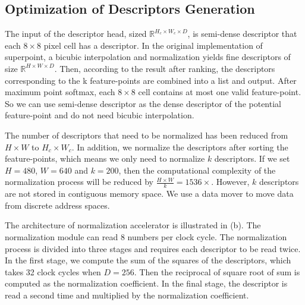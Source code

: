 



\subsection{Optimization of Descriptors Generation}

The input of the descriptor head, sized $\mathbb{R}^{H_c\times W_c\times D}$, is semi-dense descriptor that each $8\times8$ pixel cell has a descriptor. In the original implementation of superpoint, a bicubic interpolation and normalization yields fine descriptors of size $\mathbb{R}^{H\times W\times D}$. Then, according to the result after ranking, the descriptors corresponding to the k feature-points are combined into a list and output. After maximum point softmax, each $8\times8$ cell contains at most one valid feature-point. So we can use semi-dense descriptor as the dense descriptor of the potential feature-point and do not need bicubic interpolation.




The number of descriptors that need to be normalized has been reduced from $H\times W$ to $H_c\times W_c$. In addition, we normalize the descriptors after sorting the feature-points, which means we only need to normalize $k$ descriptors. If we set $H=480$, $W=640$ and $k=200$, then the computational complexity of the normalization process will be reduced by $\frac{H \times W}{k}=1536\times$. However, $k$ descriptors are not stored in contiguous memory space. We use a data mover to move data from discrete address spaces.

The architecture of normalization accelerator is illustrated in (b). The normalization module can read 8 numbers per clock cycle. The normalization process is divided into three stages and requires each descriptor to be read twice. In the first stage, we compute the sum of the squares of the descriptors, which takes 32 clock cycles when $D=256$. Then the reciprocal of square root of sum is computed as the normalization coefficient. In the final stage, the descriptor is read a second time and multiplied by the normalization coefficient.

